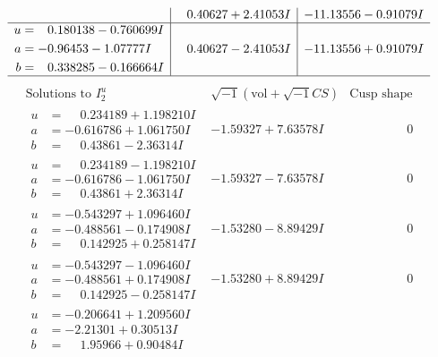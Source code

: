 \documentclass[1p]{elsarticle_modified}
\theoremstyle{definition}
\newcommand{\I}{\sqrt{-1}}
\begin{document}
$$\begin{array}{c|c|c}
 & \phantom{-}0.40627 + 2.41053 I & -11.13556 - 0.91079 I \\ \hline\begin{aligned}
u &= \phantom{-}0.180138 - 0.760699 I \\
a &= -0.96453 - 1.07777 I \\
b &= \phantom{-}0.338285 - 0.166664 I\end{aligned}
 & \phantom{-}0.40627 - 2.41053 I & -11.13556 + 0.91079 I\\
 \hline 
 \end{array}$$\newpage$$\begin{array}{c|c|c}  
\text{Solutions to }I^u_{2}& \I (\text{vol} + \sqrt{-1}CS) & \text{Cusp shape}\\
 \hline 
\begin{aligned}
u &= \phantom{-}0.234189 + 1.198210 I \\
a &= -0.616786 + 1.061750 I \\
b &= \phantom{-}0.43861 - 2.36314 I\end{aligned}
 & -1.59327 + 7.63578 I & \phantom{-0.000000 } 0 \\ \hline\begin{aligned}
u &= \phantom{-}0.234189 - 1.198210 I \\
a &= -0.616786 - 1.061750 I \\
b &= \phantom{-}0.43861 + 2.36314 I\end{aligned}
 & -1.59327 - 7.63578 I & \phantom{-0.000000 } 0 \\ \hline\begin{aligned}
u &= -0.543297 + 1.096460 I \\
a &= -0.488561 - 0.174908 I \\
b &= \phantom{-}0.142925 + 0.258147 I\end{aligned}
 & -1.53280 - 8.89429 I & \phantom{-0.000000 } 0 \\ \hline\begin{aligned}
u &= -0.543297 - 1.096460 I \\
a &= -0.488561 + 0.174908 I \\
b &= \phantom{-}0.142925 - 0.258147 I\end{aligned}
 & -1.53280 + 8.89429 I & \phantom{-0.000000 } 0 \\ \hline\begin{aligned}
u &= -0.206641 + 1.209560 I \\
a &= -2.21301 + 0.30513 I \\
b &= \phantom{-}1.95966 + 0.90484 I\end{aligned}

\end{array}$$
\end{document}
